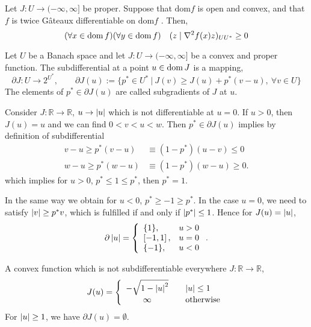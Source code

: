 \begin{theorem}
	\label{th5. Secon derivative convex.}
	 Let $J: U \rightarrow (-\infty, \infty]$ be proper. Suppose that $\text{dom} f$
	 is open and convex, and that $f$ is twice G\^ateaux differentiable on $\text{dom} f$ . Then,
	 \[
		 (\forall x \in \mathrm{dom\,} f )(\forall y \in \mathrm{dom\,} f ) \quad (z\mid  \nabla^2 f(x)z)_{UU^*} \geq 0
	 \]
\end{theorem}
\begin{definition}
	Let $U$ be a Banach space and let $J:U\rightarrow (-\infty, \infty]$ be a convex and proper function.
	The subdifferential at a point $u \in \mathrm{dom\,} J$ is a mapping,
	\[
		\partial J : U \rightarrow 2^{U^*}, \qquad \partial J(u):=\lbrace p^* \in U^* \ | \ J(v)\geq J(u)+p^*(v-u),
		\ \forall v \in U\rbrace
	\]
	The elements of $p^* \in \partial J(u)$ are called subgradients of $J$ at $u$.
\end{definition}
\begin{example}
	Consider $J:\mathbb{R}\rightarrow \mathbb{R}$, $u\rightarrow \left|u\right|$ which is not differentiable at $u=0$. If $u>0$, then $J(u)=u$ and we can find $0<v<u<w$. Then $p^* \in \partial J(u)$ implies by definition of subdifferential
	\begin{align*}
		v-u \geq p^*(v-u) &\equiv (1-p^*)(u-v) \leq 0 \\
		w-u \geq p^*(w-u) &\equiv (1-p^*)(w-u) \geq 0.
	\end{align*}
	which implies for $u>0$, $p^* \leq 1 \leq p^*$, then $p^*=1$.
	
	In the same way we obtain for $u<0$, $p^*\geq -1 \geq p^*$. 
	In the case $u=0$, we need to satisfy $\left|v\right|\geq p^*v$, which is fulfilled if and only if $\left|p^*\right|\leq 1$. Hence for $J(u)=\left|u\right|$,
	\begin{equation*}
	\partial \left|u\right|=
	\left\lbrace
		\begin{array}{lr}
		\{1\}, & u>0 \\
		\left[-1,1\right], & u=0 \\
		\{-1\}, & u < 0
		\end{array}
	\right. .
	\end{equation*}
\end{example}

\begin{example}
	A convex function which is not subdifferentiable everywhere $J:\mathbb{R} \rightarrow \mathbb{R}$, 
	\begin{equation*}
		J(u)=\left\lbrace\begin{array}{cl}
		 -\sqrt{1-\left|u\right|^2} &\quad \left|u\right|\leq 1 \\
		 \infty &\quad \text{otherwise}
		\end{array}
	\right.
	\end{equation*}
	For $\left|u\right|\geq 1$, we have $\partial J(u) = \emptyset$.
\end{example}

